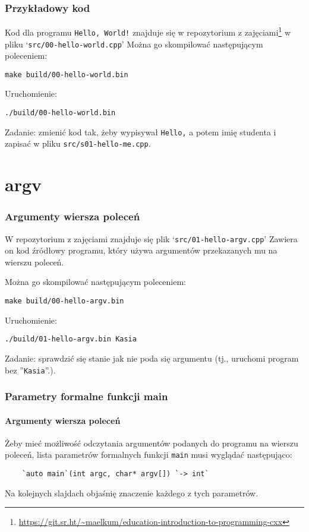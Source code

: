 \documentclass[aspectratio=169]{beamer}
\begin{document}
\begin{frame}
    \frametitle{Przykładowy kod}

    Kod dla programu {\tt Hello, World!} znajduje się w repozytorium z
    zajęciami\footnote{\url{https://git.sr.ht/~maelkum/education-introduction-to-programming-cxx}}
    w pliku `{\tt src/00-hello-world.cpp}'
    Można go skompilować następującym poleceniem:

    \vspace{1em}
    {\tt make build/00-hello-world.bin}
    \vspace{1em}

    Uruchomienie:

    \vspace{1em}
    {\tt ./build/00-hello-world.bin}
    \vspace{1em}

    Zadanie: zmienić kod tak, żeby wypisywał {\tt Hello,} a potem imię studenta
    i zapisać w pliku {\tt src/s01-hello-me.cpp}.
    \label{lecture_exercise_0}
\end{frame}

\section{argv}

\begin{frame}
    \frametitle{Argumenty wiersza poleceń}

    W repozytorium z zajęciami znajduje się plik `{\tt src/01-hello-argv.cpp}'
    Zawiera on kod źródłowy programu, który używa argumentów przekazanych mu na
    wierszu poleceń.

    Można go skompilować następującym poleceniem:

    \vspace{1em}
    {\tt make build/00-hello-argv.bin}
    \vspace{1em}

    Uruchomienie:

    \vspace{1em}
    {\tt ./build/01-hello-argv.bin Kasia}
    \vspace{1em}

    Zadanie: sprawdzić się stanie jak nie poda się argumentu (tj., uruchomi
    program bez ''{\tt Kasia}''.).
    \label{lecture_exercise_1}
\end{frame}

\begin{frame}[fragile]
    \frametitle{Parametry formalne funkcji main}
    \framesubtitle{Argumenty wiersza poleceń}

    Żeby mieć możliwość odczytania argumentów podanych do programu na wierszu
    poleceń, lista parametrów formalnych funkcji {\tt main} musi wyglądać
    następująco:

    \vspace{1em}
    \begin{lstlisting}
    `auto main`(int argc, char* argv[]) `-> int`
    \end{lstlisting}
    \vspace{1em}

    Na kolejnych slajdach objaśnię znaczenie każdego z tych parametrów.
\end{frame}
\end{document}
